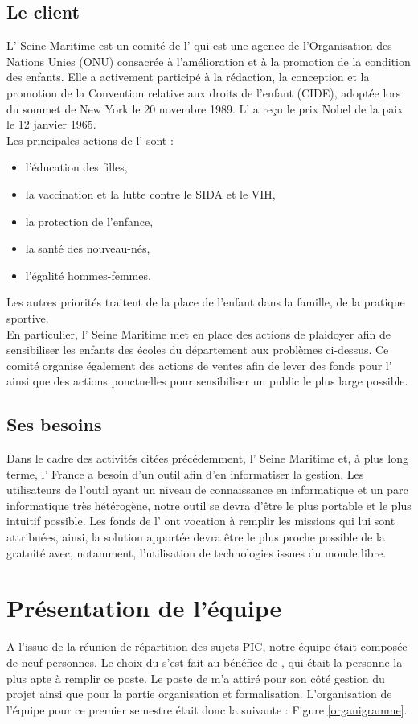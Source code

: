 \documentclass[asi]{picInsa}
\begin{document}
\subsection*{Le client}
L'\nomClient{} Seine Maritime est un comité de l'\nomClient{} qui est une agence de l'Organisation des Nations Unies (ONU) consacrée à l'amélioration et à la promotion de la condition des enfants. Elle a activement participé à la rédaction, la conception et la promotion de la Convention relative aux droits de l'enfant (CIDE), adoptée lors du sommet de New York le 20 novembre 1989. L'\nomClient{} a reçu le prix Nobel de la paix le 12 janvier 1965. \\
Les principales actions de l'\nomClient{} sont : \begin{itemize}
\item l'éducation des filles,
\item la vaccination et la lutte contre le SIDA et le VIH,
\item la protection de l'enfance,
\item la santé des nouveau-nés,
\item l'égalité hommes-femmes.
\end{itemize}
Les autres priorités traitent de la place de l'enfant dans la famille, de la pratique sportive.\\
En particulier, l'\nomClient{} Seine Maritime met en place des actions de plaidoyer afin de sensibiliser les enfants des écoles du département aux problèmes ci-dessus. Ce comité organise également des actions de ventes afin de lever des fonds pour l'\nomClient{} ainsi que des actions ponctuelles pour sensibiliser un public le plus large possible.

\subsection*{Ses besoins}
Dans le cadre des activités citées précédemment, l'\nomClient{} Seine Maritime et, à plus long terme, l'\nomClient{} France a besoin d'un outil afin d'en informatiser la gestion. Les utilisateurs de l'outil ayant un niveau de connaissance en informatique et un parc informatique très hétérogène, notre outil se devra d'être le plus portable et le plus intuitif possible. Les fonds de l'\nomClient{} ont vocation à remplir les missions qui lui sont attribuées, ainsi, la solution apportée devra être le plus proche possible de la gratuité avec, notamment, l'utilisation de technologies issues du monde libre.

\section{Présentation de l'équipe}
A l’issue de la réunion de répartition des sujets PIC, notre équipe était composée de
neuf personnes. Le choix du \CP{} s’est fait au bénéfice de \Sergi{}, qui était la personne la plus apte à remplir ce poste.
Le poste de \RQ{} m'a attiré pour son côté gestion du projet ainsi que pour la partie organisation et formalisation.
L’organisation de l’équipe pour ce premier semestre était donc la suivante : Figure \ref{organigramme}.
\end{document}
